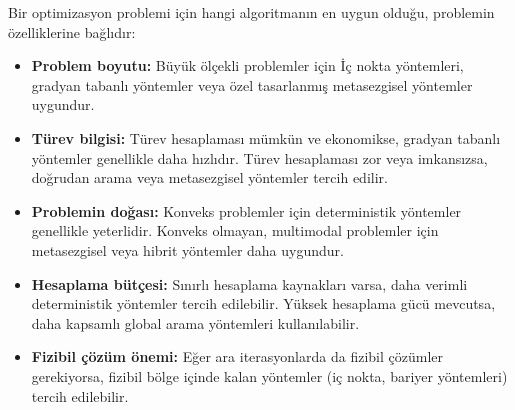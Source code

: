 \begin{tcolorbox}[title=Optimizasyon Algoritması Seçimi]
Bir optimizasyon problemi için hangi algoritmanın en uygun olduğu, problemin özelliklerine bağlıdır:

\begin{itemize}
    \item \textbf{Problem boyutu:} Büyük ölçekli problemler için İç nokta yöntemleri, gradyan tabanlı yöntemler veya özel tasarlanmış metasezgisel yöntemler uygundur.
    
    \item \textbf{Türev bilgisi:} Türev hesaplaması mümkün ve ekonomikse, gradyan tabanlı yöntemler genellikle daha hızlıdır. Türev hesaplaması zor veya imkansızsa, doğrudan arama veya metasezgisel yöntemler tercih edilir.
    
    \item \textbf{Problemin doğası:} Konveks problemler için deterministik yöntemler genellikle yeterlidir. Konveks olmayan, multimodal problemler için metasezgisel veya hibrit yöntemler daha uygundur.
    
    \item \textbf{Hesaplama bütçesi:} Sınırlı hesaplama kaynakları varsa, daha verimli deterministik yöntemler tercih edilebilir. Yüksek hesaplama gücü mevcutsa, daha kapsamlı global arama yöntemleri kullanılabilir.
    
    \item \textbf{Fizibil çözüm önemi:} Eğer ara iterasyonlarda da fizibil çözümler gerekiyorsa, fizibil bölge içinde kalan yöntemler (iç nokta, bariyer yöntemleri) tercih edilebilir.
\end{itemize}
\end{tcolorbox}


